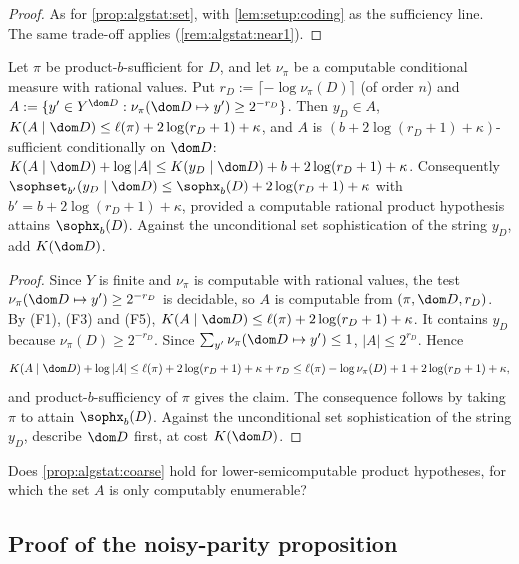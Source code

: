 \begin{proof}
As for \cref{prop:algstat:set}, with \cref{lem:setup:coding} as the sufficiency line. The same trade-off applies (\cref{rem:algstat:near1}).
\end{proof}

\begin{proposition}\label{prop:algstat:coarse}
Let $\pi$ be product-$b$-sufficient for $D$, and let $\nu_\pi$ be a computable conditional measure with rational values. Put $r_D:=\lceil-\log\nu_\pi(D)\rceil$ (of order $n$) and $A:=\{y'\in Y^{\dom D}:\nu_\pi(\dom D\mapsto y')\ge2^{-r_D}\}$. Then $y_D\in A$, $K(A\mid\dom D)\le\ell(\pi)+2\log(r_D+1)+\kappa$, and $A$ is $(b+2\log(r_D+1)+\kappa)$-sufficient conditionally on $\dom D$: $K(A\mid\dom D)+\log|A|\le K(y_D\mid\dom D)+b+2\log(r_D+1)+\kappa$. Consequently $\sophset_{b'}(y_D\mid\dom D)\le\sophx_b(D)+2\log(r_D+1)+\kappa$ with $b'=b+2\log(r_D+1)+\kappa$, provided a computable rational product hypothesis attains $\sophx_b(D)$. Against the unconditional set sophistication of the string $y_D$, add $K(\dom D)$.
\end{proposition}

\begin{proof}
Since $Y$ is finite and $\nu_\pi$ is computable with rational values, the test $\nu_\pi(\dom D\mapsto y')\ge2^{-r_D}$ is decidable, so $A$ is computable from $(\pi,\dom D,r_D)$. By (F1), (F3) and (F5), $K(A\mid\dom D)\le\ell(\pi)+2\log(r_D+1)+\kappa$. It contains $y_D$ because $\nu_\pi(D)\ge2^{-r_D}$. Since $\sum_{y'}\nu_\pi(\dom D\mapsto y')\le1$, $|A|\le2^{r_D}$. Hence
\[
K(A\mid\dom D)+\log|A|\le\ell(\pi)+2\log(r_D+1)+\kappa+r_D\le\ell(\pi)-\log\nu_\pi(D)+1+2\log(r_D+1)+\kappa,
\]
and product-$b$-sufficiency of $\pi$ gives the claim. The consequence follows by taking $\pi$ to attain $\sophx_b(D)$. Against the unconditional set sophistication of the string $y_D$, describe $\dom D$ first, at cost $K(\dom D)$.
\end{proof}

\begin{question}\label{q:algstat:lsc}
Does \cref{prop:algstat:coarse} hold for lower-semicomputable product hypotheses, for which the set $A$ is only computably enumerable?
\end{question}

\subsection{Proof of the noisy-parity proposition}\label{app:algstat:parity}

